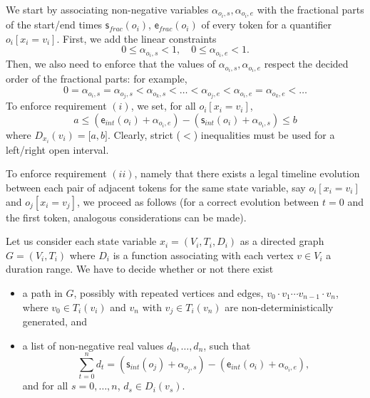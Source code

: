 We start by associating non-negative variables $\alpha_{o_i,s}, \alpha_{o_i,e}$ with the fractional parts of the start/end times $\mathsf{s}_{frac}(o_i)$, $\mathsf{e}_{frac}(o_i)$ of every token for a quantifier $o_i[x_i=v_i]$.
First, we add the linear constraints
\begin{equation*}
    0\leq \alpha_{o_i,s}<1,\quad 0\leq \alpha_{o_i,e}<1.
\end{equation*}
Then, we also need to enforce that the values of $\alpha_{o_i,s}, \alpha_{o_i,e}$ respect the decided order of the fractional parts: for example,
\begin{equation*}
    0=\alpha_{o_i,s}=\alpha_{o_j,s}<\alpha_{o_k,s}<\ldots <\alpha_{o_j,e}<\alpha_{o_i,e}=\alpha_{o_k,e}<\ldots
\end{equation*}
%
To enforce requirement $(i)$, we set, for all $o_i[x_i=v_i]$,
\begin{equation*}
    a\leq (\mathsf{e}_{int}(o_i)+\alpha_{o_i,e})-(\mathsf{s}_{int}(o_i)+\alpha_{o_i,s})\leq b
\end{equation*}
where $D_{x_i}(v_i)=\mathopen[a,b\mathclose]$. Clearly, strict ($<$) inequalities must be used for a left/right open interval.

To enforce requirement $(ii)$, namely that there exists a legal timeline evolution between each pair of adjacent tokens for the same state variable, say $o_i[x_i=v_i]$ and $o_j[x_i=v_j]$, we proceed as follows (for a correct evolution between $t=0$ and the first token, analogous considerations can be made).

Let us consider each state variable $x_i=(V_i,T_i,D_i)$ as a directed graph $G=(V_i,T_i)$ where 
$D_i$ is a function associating with each vertex $v\in V_i$ a duration range.
We have to decide whether or not there exist
\begin{itemize}
    \item a path in $G$, possibly with repeated vertices and edges, $v_0 \cdot v_1 \cdots v_{n-1}\cdot v_n$, where $v_0\in T_i(v_i)$ and $v_n$ with $v_j\in T_i(v_n)$ are non-deterministically generated, and
    \item a list of non-negative real values $d_0,\ldots,d_n$,
such that 
\[\sum_{t=0}^n d_t = (\mathsf{s}_{int}(o_j)+\alpha_{o_j,s}) - (\mathsf{e}_{int}(o_i)+\alpha_{o_i,e}),\]
and for all $s=0,\ldots, n$, $d_s\in D_i(v_s)$.
\end{itemize}


